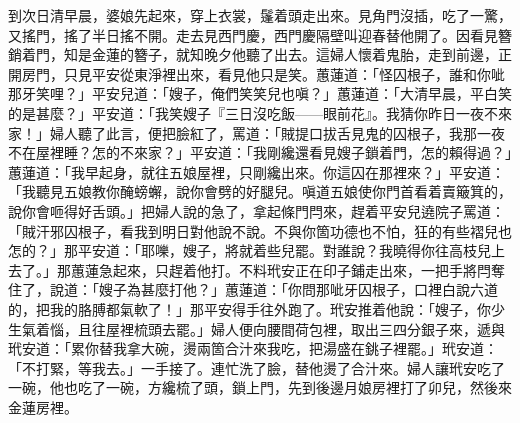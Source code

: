 到次日清早晨，婆娘先起來，穿上衣裳，鬔着頭走出來。見角門沒插，吃了一驚，又搖門，搖了半日搖不開。走去見西門慶，西門慶隔壁叫迎春替他開了。因看見簪銷着門，知是金蓮的簪子，就知晚夕他聽了出去。這婦人懷着鬼胎，走到前邊，正開房門，只見平安從東淨裡出來，看見他只是笑。蕙蓮道：「怪囚根子，誰和你呲那牙笑哩？」平安兒道：「嫂子，俺們笑笑兒也嗔？」蕙蓮道：「大清早晨，平白笑的是甚麼？」平安道：「我笑嫂子『三日沒吃飯——眼前花』。我猜你昨日一夜不來家！」{}婦人聽了此言，便把臉紅了，罵道：「賊提口拔舌見鬼的囚根子，我那一夜不在屋裡睡？怎的不來家？」平安道：「我剛纔還看見嫂子鎖着門，怎的賴得過？」蕙蓮道：「我早起身，就往五娘屋裡，只剛纔出來。你這囚在那裡來？」平安道：「我聽見五娘教你醃螃蠏，說你會劈的好腿兒。嗔道五娘使你門首看着賣簸箕的，說你會咂得好舌頭。」{}把婦人說的急了，拿起條門閂來，趕着平安兒遶院子罵道：「賊汗邪囚根子，看我到明日對他說不說。不與你箇功德也不怕，狂的有些褶兒也怎的？」那平安道：「耶嚛，嫂子，將就着些兒罷。對誰說？{}我曉得你往高枝兒上去了。」那蕙蓮急起來，只趕着他打。不料玳安正在印子鋪走出來，一把手將閂奪住了，說道：「嫂子為甚麼打他？」蕙蓮道：「你問那呲牙囚根子，口裡白說六道的，把我的胳膊都氣軟了！」那平安得手往外跑了。玳安推着他說：「嫂子，你少生氣着惱，且往屋裡梳頭去罷。」婦人便向腰間荷包裡，取出三四分銀子來，遞與玳安道：「累你替我拿大碗，燙兩箇合汁來我吃，把湯盛在銚子裡罷。」{}玳安道：「不打緊，等我去。」一手接了。連忙洗了臉，替他燙了合汁來。婦人讓玳安吃了一碗，他也吃了一碗，方纔梳了頭，鎖上門，先到後邊月娘房裡打了卯兒，然後來金蓮房裡。

